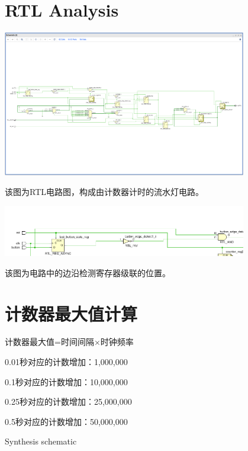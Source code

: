 \documentclass{article} %
\begin{document}
\section{RTL Analysis}
\includegraphics[width=0.8\textwidth]{3.png}\par
该图为RTL电路图，构成由计数器计时的流水灯电路。\par
\includegraphics[width=0.8\textwidth]{4.png}\par
该图为电路中的边沿检测寄存器级联的位置。\par


\section{计数器最大值计算}
计数器最大值=时间间隔×时钟频率\par
0.01秒对应的计数增加：1,000,000\par
0.1秒对应的计数增加：10,000,000\par
0.25秒对应的计数增加：25,000,000\par
0.5秒对应的计数增加：50,000,000\par
$$
$$
Synthesis schematic\par


\end{document}
